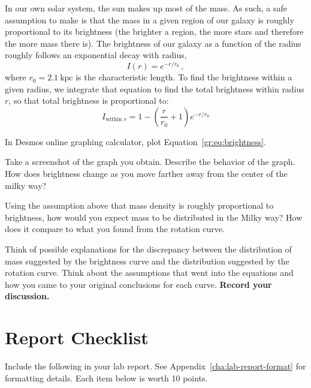 In our own solar system, the sun makes up most of the mass. As such, a safe assumption to make is that the mass in a given region of our galaxy is roughly proportional to its brightness (the brighter a region, the more stars and therefore the more mass there is). The brightness of our galaxy as a function of the radius roughly follows an exponential decay with radius,
\begin{equation}
I(r) = e^{-r/r_0} \,,
\end{equation}
where $r_0 = 2.1\:\textrm{kpc}$ is the characteristic length. To find the brightness within a given radius, we integrate that equation to find the total brightness within radius $r$, so that total brightness is proportional to:
\begin{equation}\label{gr:eq:brightness}
I_{\textrm{within }r} = 1 - \left(\frac{r}{r_0} + 1\right) e^{-r/r_0}
\end{equation}

\begin{steps}
\item In Desmos online graphing calculator, plot Equation~\ref{gr:eq:brightness}.

\item Take a screenshot of the graph you obtain. Describe the behavior of the graph. How does brightness change as you move farther away from the center of the milky way?

\item Using the assumption above that mass density is roughly proportional to brightness, how would you expect mass to be distributed in the Milky way? How does it compare to what you found from the rotation curve.

\item Think of possible explanations for the discrepancy between the distribution of mass suggested by the brightness curve and the distribution suggested by the rotation curve. Think about the assumptions that went into the equations and how you came to your original conclusions for each curve. \textbf{Record your discussion.}

\end{steps}

\section{Report Checklist}

Include the following in your lab report. See Appendix~\ref{cha:lab-report-format} for formatting details. Each item below is worth 10 points.

